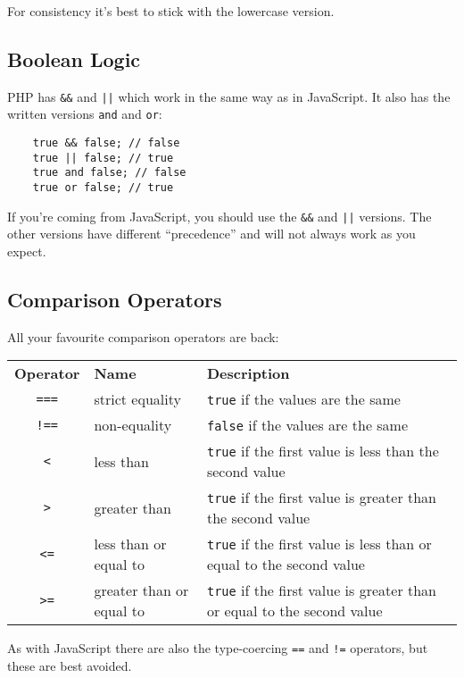 For consistency it's best to stick with the lowercase version.

\subsection{Boolean Logic}

PHP has \texttt{\&\&} and \texttt{||} which work in the same way as in JavaScript. It also has the written versions \texttt{and} and \texttt{or}:

\begin{verbatim}
    true && false; // false
    true || false; // true
    true and false; // false
    true or false; // true
\end{verbatim}

If you're coming from JavaScript, you should use the \texttt{\&\&} and \texttt{||} versions. The other versions have different ``precedence'' and will not always work as you expect.

\subsection{Comparison Operators}

All your favourite comparison operators are back:
\\

\begin{small}
    \begin{tabu}{c l X}
        \textbf{Operator} & \textbf{Name} & \textbf{Description} \\
        \texttt{===} & strict equality & \texttt{true} if the values are the same \\
        \texttt{!==} & non-equality & \texttt{false} if the values are the same\\
        \texttt{<} & less than & \texttt{true} if the first value is less than the second value  \\
        \texttt{>} & greater than & \texttt{true} if the first value is greater than the second value\\
        \texttt{<=} & less than or equal to & \texttt{true} if the first value is less than or equal to the second value  \\
        \texttt{>=} & greater than or equal to & \texttt{true} if the first value is greater than or equal to the second value
    \end{tabu}
\end{small}

As with JavaScript there are also the type-coercing \texttt{==} and \texttt{!=} operators, but these are best avoided.


